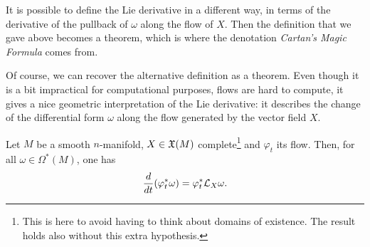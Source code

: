 It is possible to define the Lie derivative in a different way, in terms of the derivative of the pullback of $\omega$ along the flow of $X$.
Then the definition that we gave above becomes a theorem, which is where the denotation \emph{Cartan's Magic Formula} comes from.

Of course, we can recover the alternative definition as a theorem.
Even though it is a bit impractical for computational purposes, flows are hard to compute, it gives a nice geometric interpretation of the Lie derivative: it describes the change of the differential form $\omega$ along the flow generated by the vector field $X$.

\begin{theorem}\label{thm:LieDerivativeFlow}
	Let $M$ be a smooth $n$-manifold, $X\in\mathfrak{X}(M)$ complete\footnote{This is here to avoid having to think about domains of existence. The result holds also without this extra hypothesis.} and $\varphi_t$ its flow.
	Then, for all $\omega\in \Omega^*(M)$, one has
	\begin{equation}
		\frac{d}{dt}(\varphi_t^* \omega) = \varphi_t^*\mathcal{L}_X\omega.
	\end{equation}
\end{theorem}
